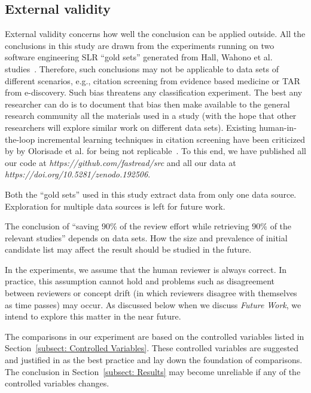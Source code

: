 \documentclass[final,twocolumn,5p]{elsarticle}
\theoremstyle{break}
\begin{document}
\subsection{External validity}

External validity concerns how well the conclusion can be applied outside. All the conclusions in this study are drawn from the experiments running on two software engineering SLR ``gold sets'' generated from Hall, Wahono et al. studies~\cite{hall2012systematic,wahono2015systematic}. Therefore, such conclusions may not be applicable to data sets of different scenarios, e.g., citation screening from evidence based medicine or TAR from e-discovery. Such bias threatens any classification experiment. The best any researcher can do is to document that bias then make available to the general research community all the materials used in a study (with the hope that other researchers will explore similar work on different data sets). Existing human-in-the-loop incremental learning techniques in citation screening have been criticized by by Olorisade et al. for being not replicable~\cite{olorisade2016critical}. To this end, we have published all our code at \textit{https://github.com/fastread/src} and all our data at \textit{https://doi.org/10.5281/zenodo.192506}.

Both the ``gold sets'' used in this study extract data from only one data source. Exploration for multiple data sources is left for future work. 

The conclusion of ``saving $90\%$ of the review effort while retrieving $90\%$ of the relevant studies'' depends on data sets. How the size and prevalence of initial candidate list may affect the result should be studied in the future.

In the experiments, we assume that the human reviewer is always correct. In practice, this assumption cannot hold and problems such as disagreement between reviewers or concept drift (in which reviewers disagree with themselves as time passes) may occur.  As discussed
below when we discuss {\em Future Work}, we intend to explore this matter in the near future.

The comparisons in our experiment are based on the controlled variables listed in Section~\ref{subsect: Controlled Variables}. These controlled variables are suggested and justified in \cite{krishna2016bigse} as the best practice and lay down the foundation of comparisons. The conclusion in Section~\ref{subsect: Results} may become unreliable if any of the controlled variables changes.
\end{document}
